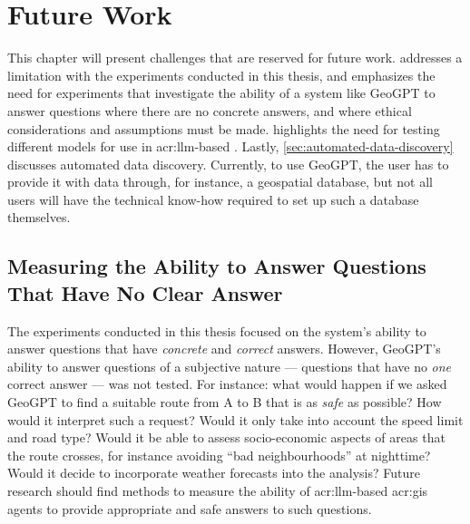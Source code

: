 \chapter{Future Work}
\label{cha:future-work}

\begin{comment}
Consider where you would like to extend or improve this work, or how somebody else could continue it.
These extensions might either be continuing the ongoing direction or taking a side direction that became obvious during the work.
Further, possible solutions to limitations in the work conducted, highlighted in Section~\ref{sec:discussion} may be presented.

Note that in the Specialisation Project Report, the Future Work section will be a key part of your plan for the novel work to be carried out in the next semester,
while in the Master's Thesis, the Future Work section rather will point to issues that others might be interested in addressing.
This can include options and alternatives that you did not try out yourself, or potential improvements and extensions to your experiments or system.
\end{comment}

This chapter will present challenges that are reserved for future work.  addresses a limitation with the experiments conducted in this thesis, and emphasizes the need for experiments that investigate the ability of a system like GeoGPT to answer questions where there are no concrete answers, and where ethical considerations and assumptions must be made.  highlights the need for testing different models for use in \acrshort{acr:llm}-based . Lastly, \autoref{sec:automated-data-discovery} discusses automated data discovery. Currently, to use GeoGPT, the user has to provide it with data through, for instance, a geospatial database, but not all users will have the technical know-how required to set up such a database themselves.

\section{Measuring the Ability to Answer Questions That Have No Clear Answer}
\label{sec:no-clear-answer}

The experiments conducted in this thesis focused on the system's ability to answer questions that have \textit{concrete} and \textit{correct} answers. However, GeoGPT's ability to answer questions of a subjective nature --- questions that have no \textit{one} correct answer --- was not tested. For instance: what would happen if we asked GeoGPT to find a suitable route from A to B that is as \textit{safe} as possible? How would it interpret such a request? Would it only take into account the speed limit and road type? Would it be able to assess socio-economic aspects of areas that the route crosses, for instance avoiding \enquote{bad neighbourhoods} at nighttime? Would it decide to incorporate weather forecasts into the analysis? Future research should find methods to measure the ability of \acrshort{acr:llm}-based \acrshort{acr:gis} agents to provide appropriate and safe answers to such questions.

